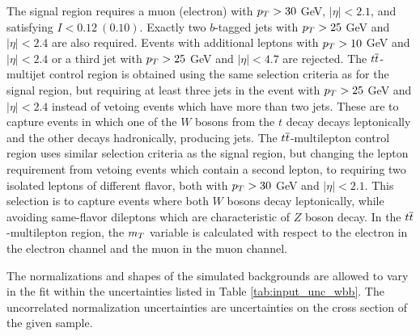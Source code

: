 The signal region requires a muon (electron)
 with {$p_T > 30$} GeV,
 {$|\eta| < 2.1$}, and satisfying {$I < 0.12~(0.10)$}.
Exactly two $b$-tagged jets with
 {$p_T > 25$} GeV and
 {$|\eta| < 2.4$} are also required. %
Events with additional leptons with
 {$p_T > 10$} GeV and {$|\eta| < 2.4$} or
 a third jet with {$p_T > 25$} GeV and {$|\eta| < 4.7$}
 are rejected.
The $t\overline{t}$-multijet control region is obtained
 using the same selection criteria as for the signal region,
 but requiring at least three jets in the event
 with {$p_T>25$} GeV and {$|\eta|<2.4$} instead of
 vetoing events which have more than two jets.
These are to capture events in which one of the
 $W$ bosons from the $t$ decay decays leptonically
 and the other decays hadronically, producing jets.
The $t\overline{t}$-multilepton control region uses
 similar selection criteria as the signal region,
 but changing the lepton requirement from vetoing
 events which contain a second lepton,
 to requiring two isolated leptons of different flavor,
 both with {$p_T>30$} GeV and {$|\eta|<2.1$}.
This selection is to capture \ttbar events where
 both $W$ bosons decay leptonically, 
 while avoiding same-flavor dileptons which 
 are characteristic of $Z$ boson decay.
In the $t\overline{t}$-multilepton region,
 the $m_T$ variable is calculated with respect to
 the electron in the electron channel
 and the muon in the muon channel.

The normalizations and shapes of the simulated backgrounds
 are allowed to vary in the fit
 within the uncertainties listed in Table \ref{tab:input_unc_wbb}.
The uncorrelated normalization uncertainties
 are uncertainties on the cross section of
 the given sample.

